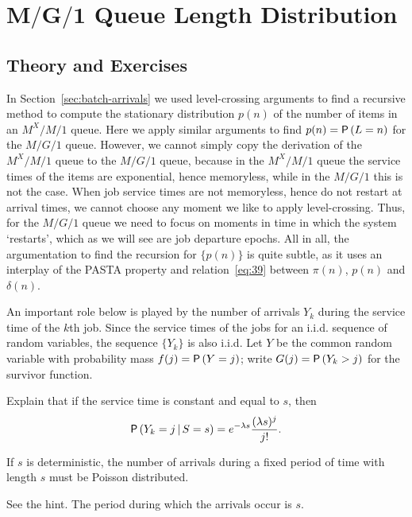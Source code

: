 \section
[$M/G/1$ Queue Length Distribution]
{$\mathbf{M/G/1}$ Queue Length Distribution}
\label{sec:distr-queue-length}


\subsection*{Theory and Exercises}



In Section~\ref{sec:batch-arrivals} we used level-crossing arguments 
to find a recursive method to compute  the stationary distribution $p(n)$ of the number of items in an $M^X/M/1$ queue. Here we apply similar arguments to find $p(n)=\P{L=n}$ for the $M/G/1$ queue.
However, we cannot simply copy the derivation of the $M^X/M/1$ queue to the $M/G/1$ queue, because in the $M^X/M/1$ queue the service times of the items are exponential,
hence memoryless, while in the $M/G/1$ this is not the case. When job service times are 
not memoryless, hence do not restart at arrival times, we cannot choose any moment we like to apply level-crossing. Thus, for the $M/G/1$ queue
we need to focus on moments in time in which the system `restarts', which as we will see are job departure epochs.  All in all, the argumentation to find the recursion for $\{p(n)\}$ is quite subtle, as it uses an interplay of the PASTA property and relation~\eqref{eq:39}
between $\pi(n)$, $p(n)$ and $\delta(n)$.  

An important role below is played by  the number of  arrivals $Y_k$ during the service time of the $k$th job.  Since the service times of the jobs for an i.i.d. sequence of random variables, the sequence $\{Y_k\}$ is also i.i.d. Let $Y$ be the common random variable with probability mass
 $f(j) = \P{Y = j}$; write $G(j) = \P{Y_k > j}$ for the survivor function.


\begin{exercise}
 Explain that if the service time is constant and equal to $s$, then
\begin{equation}\label{eq:4}
  \P{Y_k = j\given S=s} = e^{-\lambda s}\frac{(\lambda s)^j}{j!}.
\end{equation}
\begin{hint}
If $s$ is deterministic, the number of arrivals during a fixed
    period of time with length $s$ must be Poisson distributed.
\end{hint}
  \begin{solution}
See the hint.  The period during which the arrivals occur is $s$. 
  \end{solution}
\end{exercise}


